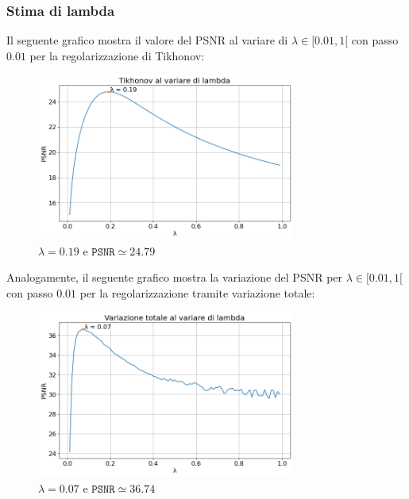 \documentclass[11pt]{article}
\begin{document}
\subsubsection{Stima di lambda}
Il seguente grafico mostra il valore del PSNR al variare di $\lambda \in [0.01, 1[$ con passo $0.01$ per la regolarizzazione di Tikhonov:
\begin{figure}[H]
    \centering
    \includegraphics[width=8.5cm]{esecuzione/1/tikhonov_lambda.png}
    \caption{$\lambda=0.19$ e $\texttt{PSNR} \simeq 24.79$}
    \label{fig:tikhonov_lambda1}
\end{figure}
Analogamente, il seguente grafico mostra la variazione del PSNR per $\lambda \in [0.01, 1[$ con passo $0.01$ per la regolarizzazione tramite variazione totale:
\begin{figure}[H]
    \centering
    \includegraphics[width=8.5cm]{esecuzione/1/tv_lambda.png}
    \caption{$\lambda=0.07$ e $\texttt{PSNR} \simeq 36.74$}
    \label{fig:tv_lambda1}
\end{figure}	
\end{document}
